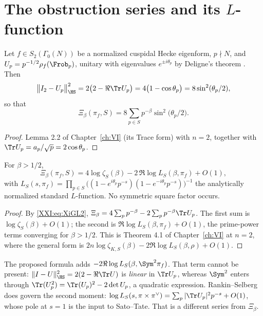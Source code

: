\section{The obstruction series and its $L$-function}

\begin{lemma}\label{XXI:lem:HS}
Let $f\in S_2(\Gamma_0(N))$ be a normalized cuspidal Hecke eigenform, $p\nmid N$, and
$U_p=p^{-1/2}\rho_f(\Frob_p)$, unitary with eigenvalues $e^{\pm i\theta_p}$ by Deligne's
theorem \cite{Deligne}. Then
\[
\bigl\|I_2-U_p\bigr\|_\HS^2=2\bigl(2-\Re\Tr U_p\bigr)=4\bigl(1-\cos\theta_p\bigr)=8\sin^2(\theta_p/2),
\]
so that
\begin{equation}\label{XXI:eq:XiGL2}
\Xi_\beta(\pi_f,S)=8\sum_{p\in S}p^{-\beta}\sin^2\!\bigl(\theta_p/2\bigr).
\end{equation}
\end{lemma}

\begin{proof}
Lemma 2.2 of Chapter~\ref{ch:VI} (its Trace form) with $n=2$, together with $\Tr U_p=a_p/\sqrt p=2\cos\theta_p$.
\end{proof}

\begin{theorem}\label{XXI:thm:L}
For $\beta>1/2$,
\begin{equation}\label{XXI:eq:Lcorrect}
\Xi_\beta(\pi_f,S)=4\log\zeta_S(\beta)-2\,\Re\log L_S(\beta,\pi_f)+O(1),
\end{equation}
with $L_S(s,\pi_f)=\prod_{p\in S}\bigl((1-e^{i\theta_p}p^{-s})(1-e^{-i\theta_p}p^{-s})\bigr)^{-1}$
the analytically normalized standard $L$-function. No symmetric square factor occurs.
\end{theorem}

\begin{proof}
By \eqref{XXI:eq:XiGL2}, $\Xi_\beta=4\sum_pp^{-\beta}-2\sum_pp^{-\beta}\Tr U_p$. The first sum is
$\log\zeta_S(\beta)+O(1)$; the second is $\Re\log L_S(\beta,\pi_f)+O(1)$, the prime-power
terms converging for $\beta>1/2$. This is Theorem 4.1 of Chapter~\ref{ch:VI} at $n=2$, where the general
form is $2n\log\zeta_{K,S}(\beta)-2\Re\log L_S(\beta,\rho)+O(1)$.
\end{proof}

\begin{remark}\label{XXI:rem:sym2}
The proposed formula adds $-2\Re\log L_S(\beta,\Sym^2\pi_f)$. That term cannot be present:
$\|I-U\|_\HS^2=2(2-\Re\Tr U)$ is \emph{linear} in $\Tr U_p$, whereas $\Sym^2$ enters through
$\Tr(U_p^2)=\Tr(U_p)^2-2\det U_p$, a quadratic expression. Rankin--Selberg does govern the
second moment: $\log L_S(s,\pi\times\pi^\vee)=\sum_p|\Tr U_p|^2p^{-s}+O(1)$, whose pole at
$s=1$ is the input to Sato--Tate. That is a different series from $\Xi_\beta$.
\end{remark}

